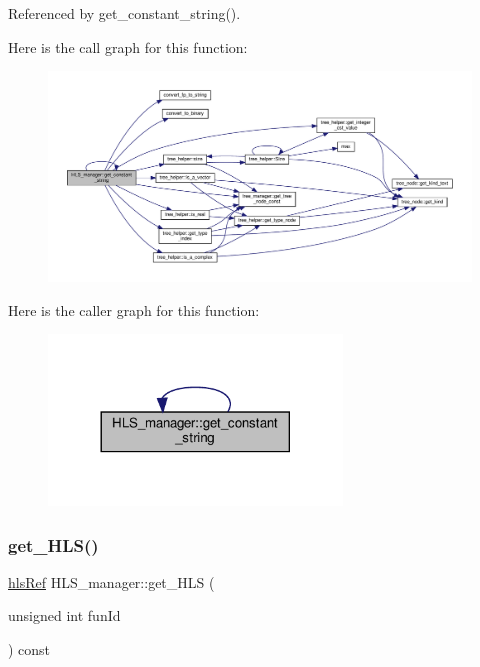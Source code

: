 Referenced by get\+\_\+constant\+\_\+string().

Here is the call graph for this function\+:
\nopagebreak
\begin{figure}[H]
\begin{center}
\leavevmode
\includegraphics[width=350pt]{dc/dd7/classHLS__manager_adb55871297598407cb473ef10647048b_cgraph}
\end{center}
\end{figure}
Here is the caller graph for this function\+:
\nopagebreak
\begin{figure}[H]
\begin{center}
\leavevmode
\includegraphics[width=221pt]{dc/dd7/classHLS__manager_adb55871297598407cb473ef10647048b_icgraph}
\end{center}
\end{figure}
\mbox{\label{classHLS__manager_a9bf8850e21fc2d43665009fab8d3c095}} 
\subsubsection{\texorpdfstring{get\+\_\+\+H\+L\+S()}{get\_HLS()}}
{\footnotesize\ttfamily \hyperlink{hls_8hpp_a75d0c73923d0ddfa28c4843a802c73a7}{hls\+Ref} H\+L\+S\+\_\+manager\+::get\+\_\+\+H\+LS (\begin{DoxyParamCaption}\item[{unsigned int}]{fun\+Id }\end{DoxyParamCaption}) const}



